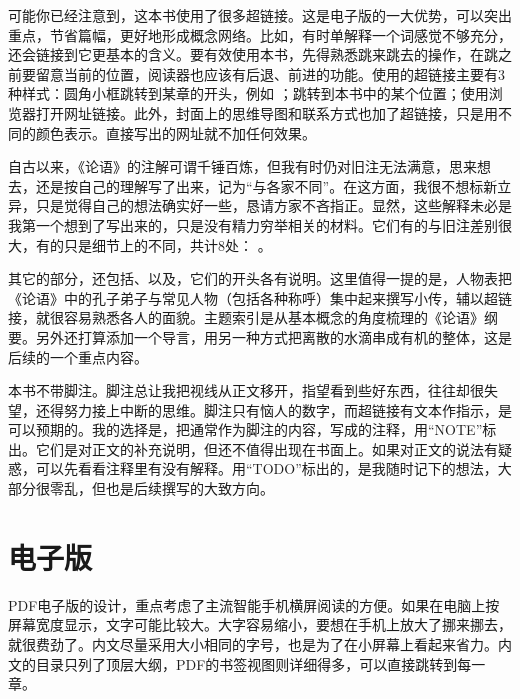 可能你已经注意到，这本书使用了很多超链接。这是电子版的一大优势，可以突出重点，节省篇幅，更好地形成概念网络。比如，有时单解释一个词感觉不够充分，还会链接到它更基本的含义。要有效使用本书，先得熟悉跳来跳去的操作，在跳之前要留意当前的位置，阅读器也应该有后退、前进的功能。使用的超链接主要有3种样式：圆角小框跳转到某章的开头，例如 ；跳转到本书中的某个位置；使用浏览器打开网址链接。此外，封面上的思维导图和联系方式也加了超链接，只是用\textcolor{\lycoverlinkcolor}{不同的颜色}表示。直接写出的网址就不加任何效果。

自古以来，《论语》的注解可谓千锤百炼，但我有时仍对旧注无法满意，思来想去，还是按自己的理解写了出来，记为“与各家不同”。在这方面，我很不想标新立异，只是觉得自己的想法确实好一些，恳请方家不吝指正。显然，这些解释未必是我第一个想到了写出来的，只是没有精力穷举相关的材料。它们有的与旧注差别很大，有的只是细节上的不同，共计8处：       。

其它的部分，还包括、以及，它们的开头各有说明。这里值得一提的是，人物表把《论语》中的孔子弟子与常见人物（包括各种称呼）集中起来撰写小传，辅以超链接，就很容易熟悉各人的面貌。主题索引是从基本概念的角度梳理的《论语》纲要。另外还打算添加一个导言，用另一种方式把离散的水滴串成有机的整体，这是后续的一个重点内容。

本书不带脚注。脚注总让我把视线从正文移开，指望看到些好东西，往往却很失望，还得努力接上中断的思维。脚注只有恼人的数字，而超链接有文本作指示，是可以预期的。我的选择是，把通常作为脚注的内容，写成的注释，用“NOTE”标出。它们是对正文的补充说明，但还不值得出现在书面上。如果对正文的说法有疑惑，可以先看看注释里有没有解释。用“TODO”标出的，是我随时记下的想法，大部分很零乱，但也是后续撰写的大致方向。



\lypdfbookmark\section*{电子版}

PDF电子版的设计，重点考虑了主流智能手机横屏阅读的方便。如果在电脑上按屏幕宽度显示，文字可能比较大。大字容易缩小，要想在手机上放大了挪来挪去，就很费劲了。内文尽量采用大小相同的字号，也是为了在小屏幕上看起来省力。内文的目录只列了顶层大纲，PDF的书签视图则详细得多，可以直接跳转到每一章。

